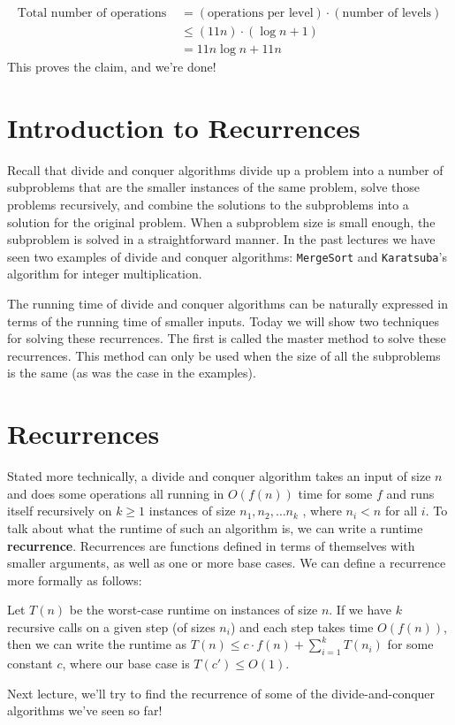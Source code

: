 \documentclass [12pt]{article}
\begin{document}
\begin{align*}
    \text{Total number of operations } &= (\text{operations per level}) \cdot (\text{number of levels}) \\
    &\leq (11n)\cdot (\log n + 1) \\
    &= 11n \log n + 11n
\end{align*}
This proves the claim, and we’re done!

\section{Introduction to Recurrences}

Recall that divide and conquer algorithms divide up a problem into a number of subproblems that are the smaller instances of the same problem, solve those problems recursively, and combine the solutions to the subproblems into a solution for the original problem. When a subproblem size is small enough, the subproblem is solved in a straightforward manner. In the past lectures we have seen two examples of divide and conquer algorithms: \texttt{MergeSort} and \texttt{Karatsuba}’s algorithm for integer multiplication.

The running time of divide and conquer algorithms can be naturally expressed in terms of the running time of smaller inputs. Today we will show two techniques for solving these recurrences. The first is called the master method to solve these recurrences. This method can only be used when the size of all the subproblems is the same (as was the case in the examples).

\section{Recurrences}
Stated more technically, a divide and conquer algorithm takes an input of size $n$ and does some operations all running in $O(f (n))$ time for some $f$ and runs itself recursively on $k \geq 1$ instances of size $n_1, n_2, \dots n_k$ , where $n_i < n$ for all $i$. To talk about what the runtime of such an algorithm is, we can write a runtime \textbf{recurrence}. Recurrences are functions defined in terms of themselves with smaller arguments, as well as one or more base cases. We can
define a recurrence more formally as follows:

Let $T(n)$ be the worst-case runtime on instances of size $n$. If we have $k$ recursive calls on a given step (of sizes $n_i$) and each step takes time $O(f (n))$, then we can write the runtime as $T(n) \leq c \cdot f (n) + \sum_{i=1}^k T(n_i)$ for some constant $c$, where our base case is $T(c') \leq O(1)$.

Next lecture, we'll try to find the recurrence of some of the divide-and-conquer algorithms we've seen so far!
\end{document}
